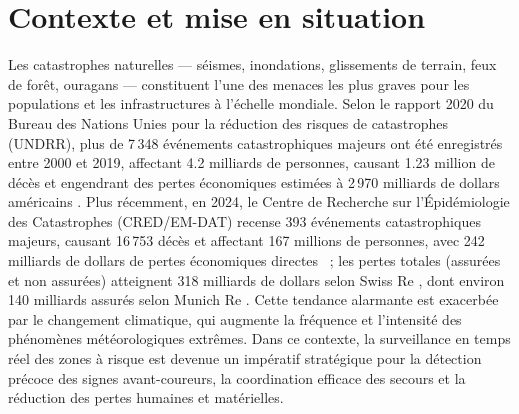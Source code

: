 \label{sec:Introduction}

\section{Contexte et mise en situation}\label{sec:Contexte}

Les catastrophes naturelles --- séismes, inondations, glissements de terrain, feux de forêt, ouragans --- constituent l'une des menaces les plus graves pour les populations et les infrastructures à l'échelle mondiale. Selon le rapport 2020 du Bureau des Nations Unies pour la réduction des risques de catastrophes (UNDRR), plus de 7\,348 événements catastrophiques majeurs ont été enregistrés entre 2000 et 2019, affectant 4.2 milliards de personnes, causant 1.23 million de décès et engendrant des pertes économiques estimées à 2\,970 milliards de dollars américains \cite{undrr2020}. Plus récemment, en 2024, le Centre de Recherche sur l'Épidémiologie des Catastrophes (CRED/EM-DAT) recense 393 événements catastrophiques majeurs, causant 16\,753 décès et affectant 167 millions de personnes, avec 242 milliards de dollars de pertes économiques directes \cite{cred_emdat_2025}~; les pertes totales (assurées et non assurées) atteignent 318 milliards de dollars selon Swiss Re \cite{swiss_re_2025}, dont environ 140 milliards assurés selon Munich Re \cite{munich_re_2025}. Cette tendance alarmante est exacerbée par le changement climatique, qui augmente la fréquence et l'intensité des phénomènes météorologiques extrêmes. Dans ce contexte, la surveillance en temps réel des zones à risque est devenue un impératif stratégique pour la détection précoce des signes avant-coureurs, la coordination efficace des secours et la réduction des pertes humaines et matérielles.

